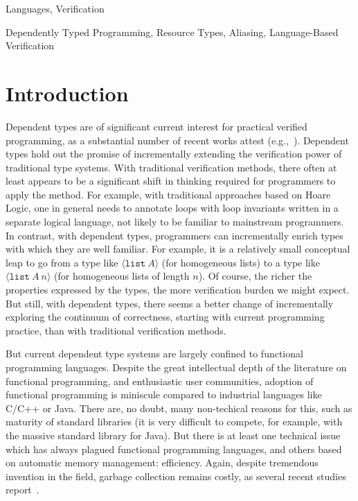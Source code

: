 \documentclass[9pt,natbib]{sigplanconf}
\begin{document}
\terms
Languages, Verification

\keywords
Dependently Typed Programming, Resource Types, Aliasing, Language-Based Verification

\section{Introduction}

Dependent types are of significant current interest for practical
verified programming, as a substantial number of recent works attest
(e.g.,~\cite{oury+08,norell07,pasalic+07,sheard06,nanevski+05,licata+05,chenxi05}).
Dependent types hold out the promise of incrementally extending the
verification power of traditional type systems.  With traditional
verification methods, there often at least appears to be a significant
shift in thinking required for programmers to apply the method.  For
example, with traditional approaches based on Hoare Logic, one in
general needs to annotate loops with loop invariants written in a
separate logical language, not likely to be familiar to mainstream
programmers.  In contrast, with dependent types, programmers can
incrementally enrich types with which they are well familiar.  For
example, it is a relatively small conceptual leap to go from a type
like $\langle \texttt{list}\ A\rangle$ (for homogeneous lists) to a
type like $\langle \texttt{list}\ A\ n\rangle$ (for homogeneous lists
of length $n$).  Of course, the richer the properties expressed by the
types, the more verification burden we might expect.  But still, with
dependent types, there seems a better change of incrementally
exploring the continuum of correctness, starting with current
programming practice, than with traditional verification methods.

But current dependent type systems are largely confined to functional
programming languages.  Despite the great intellectual depth of the
literature on functional programming, and enthusiastic user
communities, adoption of functional programming is miniscule compared
to industrial languages like C/C++ or Java.  There are, no doubt, many
non-techical reasons for this, such as maturity of standard libraries
(it is very difficult to compete, for example, with the massive
standard library for Java).  But there is at least one technical issue
which has always plagued functional programming languages, and others
based on automatic memory management: efficiency.  Again, despite
tremendous invention in the field, garbage collection remains costly,
as several recent studies report~\cite{Xian2008,hertz+05}.
\end{document}
